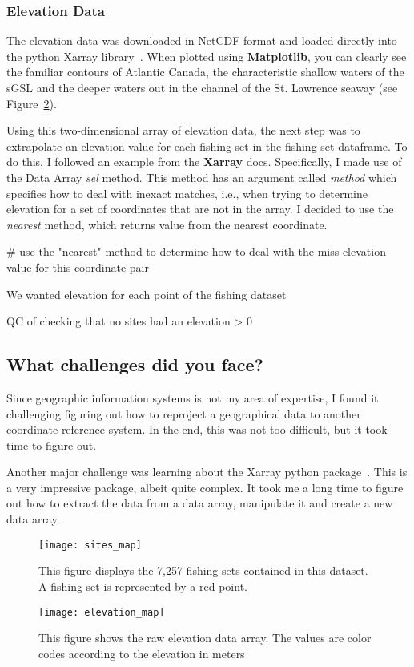 \subsubsection{Elevation Data}

The elevation data was downloaded in NetCDF format and loaded directly into the python Xarray library~\cite{xarray}.
When plotted using \textbf{Matplotlib}, you can clearly see the familiar contours of Atlantic Canada, the characteristic
shallow waters of the sGSL and the deeper waters out in the channel of the St. Lawrence seaway (see Figure~\ref{fig:elevation_map}).

Using this two-dimensional array of elevation data, the next step was to extrapolate an elevation value for each fishing set in the fishing set dataframe.
To do this, I followed an example from the \textbf{Xarray} docs.
Specifically, I made use of the Data Array \textit{sel} method.
This method has an argument called \textit{method} which specifies how to deal with inexact matches, i.e.,
when trying to determine elevation for a set of coordinates that are not in the array. I decided to use the \textit{nearest} method,
which returns value from the nearest coordinate.

# use the "nearest" method to determine how to deal with the miss elevation value for this coordinate pair

We wanted elevation for each point of the fishing dataset


QC of checking that no sites had an elevation > 0






\subsection{What challenges did you face?}

Since geographic information systems is not my area of expertise, I found it challenging figuring out how to reproject a geographical data to another
coordinate reference system.
In the end, this was not too difficult, but it took time to figure out.

Another major challenge was learning about the Xarray python package~\cite{xarray}.
This is a very impressive package, albeit quite complex.
It took me a long time to figure out how to extract the data from a data array, manipulate it and create a new data array.


\begin{figure}
    \texttt{[image: sites\_map]}
    \caption{This figure displays the 7,257 fishing sets contained in this dataset. A fishing set is represented by a red point.}
    \label{fig:set_map}
\end{figure}


\begin{figure}
    \texttt{[image: elevation\_map]}
    \caption{This figure shows the raw elevation data array. The values are color codes according to the elevation in meters}
    \label{fig:elevation_map}
\end{figure}
